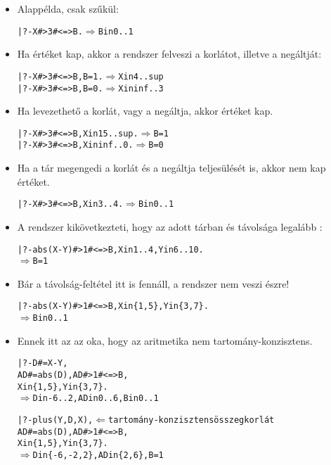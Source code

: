 \begin{itemize}
\item Alappélda, csak  szűkül:
\begin{alltt}
| ?- X#>3 #<=> B.                  \(\Rightarrow\) B in 0..1
\end{alltt}
\item Ha  értéket kap, akkor a rendszer felveszi a korlátot, illetve a negáltját:
\begin{alltt}
| ?- X#>3 #<=> B, B = 1.           \(\Rightarrow\) X in 4..sup
| ?- X#>3 #<=> B, B = 0.           \(\Rightarrow\) X in inf..3
\end{alltt}
\item Ha levezethető a korlát, vagy a negáltja, akkor  értéket kap.
\begin{alltt}
| ?- X#>3 #<=> B, X in 15..sup.    \(\Rightarrow\) B = 1
| ?- X#>3 #<=> B, X in inf..0.     \(\Rightarrow\) B = 0
\end{alltt}
\item Ha a tár megengedi a korlát és a negáltja teljesülését is, akkor  nem
kap értéket.
\begin{alltt}
| ?- X#>3 #<=> B, X in 3..4.       \(\Rightarrow\) B in 0..1
\end{alltt}
\item A rendszer kikövetkezteti, hogy az adott tárban  és  távolsága legalább :
\begin{alltt}
| ?- abs(X-Y)#>1 #<=> B, X in 1..4, Y in 6..10.
             \(\Rightarrow\) B = 1
\end{alltt}
\item Bár a távolság-feltétel itt is fennáll, a rendszer nem veszi észre!
\begin{alltt}
| ?- abs(X-Y)#>1 #<=> B, X in \{1,5\}, Y in \{3,7\}.
             \(\Rightarrow\) B in 0..1 
\end{alltt}
\item Ennek itt az az oka, hogy az aritmetika nem tartomány-konzisztens.
\begin{alltt}
| ?- D #= X-Y, 
     AD #= abs(D), AD#>1 #<=> B, 
     X in \{1,5\}, Y in \{3,7\}.
             \(\Rightarrow\) D in -6..2, AD in 0..6, B in 0..1
\end{alltt}
\begin{alltt}
| ?- plus(Y, D, X),      \(\Leftarrow\){\rm tartomány-konzisztens összegkorlát}
     AD #= abs(D), AD#>1 #<=> B, 
     X in \{1,5\}, Y in \{3,7\}.
             \(\Rightarrow\) D in \{-6,-2,2\}, AD in \{2,6\}, B = 1
\end{alltt}
\end{itemize}

